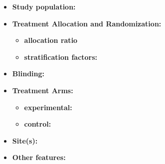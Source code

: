 \begin{itemize}
    \item \textbf{Study population: }

    \item \textbf{Treatment Allocation and Randomization: }

    \begin{itemize}
        \item \textbf{allocation ratio}  %
        \item \textbf{stratification factors: } %
    \end{itemize}

    \item \textbf{Blinding: } %

    \item \textbf{Treatment Arms: }

    \begin{itemize}
        \item \textbf{experimental: } %
        \item \textbf{control: } %
    \end{itemize}

    \item \textbf{Site(s): } 

    \item \textbf{Other features: }

\end{itemize}